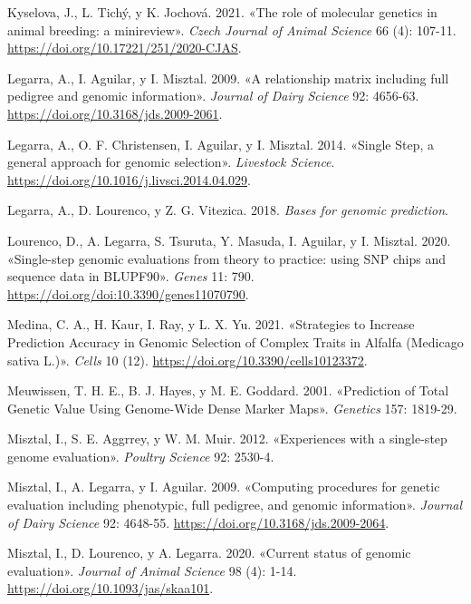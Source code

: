 \documentclass[11pt,spanish,a4paper,oneside,]{book} %
\begin{document}
\leavevmode\hypertarget{ref-cite:32}{}%
Kyselova, J., L. Tichý, y K. Jochová. 2021. «The role of molecular genetics in animal breeding: a minireview». \emph{Czech Journal of Animal Science} 66 (4): 107-11. \url{https://doi.org/10.17221/251/2020-CJAS}.

\leavevmode\hypertarget{ref-cite:17}{}%
Legarra, A., I. Aguilar, y I. Misztal. 2009. «A relationship matrix including full pedigree and genomic information». \emph{Journal of Dairy Science} 92: 4656-63. \url{https://doi.org/10.3168/jds.2009-2061}.

\leavevmode\hypertarget{ref-cite:15}{}%
Legarra, A., O. F. Christensen, I. Aguilar, y I. Misztal. 2014. «Single Step, a general approach for genomic selection». \emph{Livestock Science}. \url{https://doi.org/10.1016/j.livsci.2014.04.029}.

\leavevmode\hypertarget{ref-cite:30}{}%
Legarra, A., D. Lourenco, y Z. G. Vitezica. 2018. \emph{Bases for genomic prediction}.

\leavevmode\hypertarget{ref-cite:22}{}%
Lourenco, D., A. Legarra, S. Tsuruta, Y. Masuda, I. Aguilar, y I. Misztal. 2020. «Single-step genomic evaluations from theory to practice: using SNP chips and sequence data in BLUPF90». \emph{Genes} 11: 790. \url{https://doi.org/doi:10.3390/genes11070790}.

\leavevmode\hypertarget{ref-cite:38}{}%
Medina, C. A., H. Kaur, I. Ray, y L. X. Yu. 2021. «Strategies to Increase Prediction Accuracy in Genomic Selection of Complex Traits in Alfalfa (Medicago sativa L.)». \emph{Cells} 10 (12). \url{https://doi.org/10.3390/cells10123372}.

\leavevmode\hypertarget{ref-cite:8}{}%
Meuwissen, T. H. E., B. J. Hayes, y M. E. Goddard. 2001. «Prediction of Total Genetic Value Using Genome-Wide Dense Marker Maps». \emph{Genetics} 157: 1819-29.

\leavevmode\hypertarget{ref-cite:14}{}%
Misztal, I., S. E. Aggrrey, y W. M. Muir. 2012. «Experiences with a single-step genome evaluation». \emph{Poultry Science} 92: 2530-4.

\leavevmode\hypertarget{ref-cite:16}{}%
Misztal, I., A. Legarra, y I. Aguilar. 2009. «Computing procedures for genetic evaluation including phenotypic, full pedigree, and genomic information». \emph{Journal of Dairy Science} 92: 4648-55. \url{https://doi.org/10.3168/jds.2009-2064}.

\leavevmode\hypertarget{ref-cite:18}{}%
Misztal, I., D. Lourenco, y A. Legarra. 2020. «Current status of genomic evaluation». \emph{Journal of Animal Science} 98 (4): 1-14. \url{https://doi.org/10.1093/jas/skaa101}.
\end{document}
